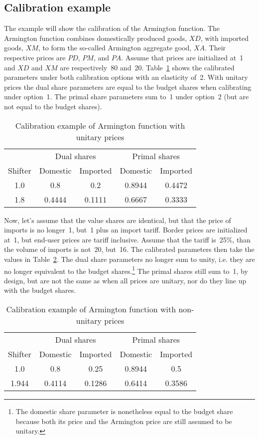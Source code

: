 \subsection{Calibration example}

The example will show the calibration of the Armington function. The Armington function combines
domestically produced goods, $\mathit{XD}$, with imported goods, $\mathit{XM}$, to form the
so-called Armington aggregate good, $\mathit{XA}$. Their respective prices are $\mathit{PD}$,
$\mathit{PM}$, and $\mathit{PA}$. Assume that prices are initialized at~1 and $\mathit{XD}$ and
$\mathit{XM}$ are respectively~80 and~20. Table~\ref{tab:TabA1} shows the calibrated parameters
under both calibration options with an elasticity of~2. With unitary prices the dual share
parameters are equal to the budget shares when calibrating under option~1. The primal share
parameters sum to~1 under option~2 (but are not equal to the budget shares).

\begin{table}[ht]
\centering
\caption{Calibration example of Armington function with unitary prices}
\label{tab:TabA1}
\begin{tabular}{c c c c c}
\hline
{} & \multicolumn{2}{c}{Dual shares} & \multicolumn{2}{c}{Primal shares} \\
Shifter & Domestic & Imported & Domestic & Imported \\
\hline
\hline
1.0 & 0.8 & 0.2 & 0.8944 & 0.4472 \\
1.8 & 0.4444 & 0.1111 & 0.6667 & 0.3333 \\
\hline
\end{tabular}
\end{table}

Now, let's assume that the value shares are identical, but that the price of imports is no
longer~1, but~1 plus an import tariff. Border prices are initialized at~1, but end-user prices are
tariff inclusive. Assume that the tariff is~25\%, than the volume of imports is not~20, but~16. The
calibrated parameters then take the values in Table~\ref{tab:TabA2}. The dual share parameters
no longer sum to unity, i.e. they are no longer equivalent to the budget shares.\footnote{The
domestic share parameter is nonetheless equal to the budget share because both its price
and the Armington price are still assumed to be unitary.} The primal shares still sum to~1,
by design, but are not the same as when all prices are unitary, nor do they line up with the
budget shares.

\begin{table}[ht]
\centering
\caption{Calibration example of Armington function with non-unitary prices}
\label{tab:TabA2}
\begin{tabular}{c c c c c}
\hline
{} & \multicolumn{2}{c}{Dual shares} & \multicolumn{2}{c}{Primal shares} \\
Shifter & Domestic & Imported & Domestic & Imported \\
\hline
\hline
1.0 & 0.8 & 0.25 & 0.8944 & 0.5 \\
1.944 & 0.4114 & 0.1286 & 0.6414 & 0.3586 \\
\hline
\end{tabular}
\end{table}

